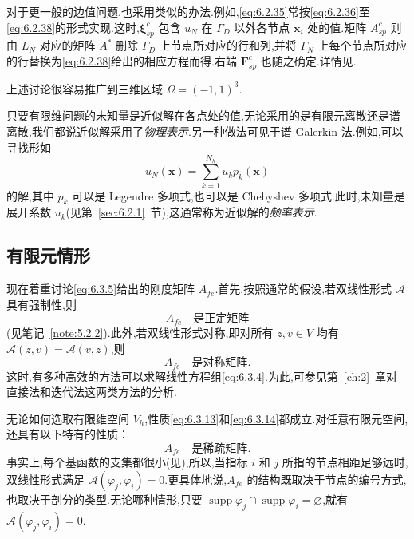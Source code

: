 对于更一般的边值问题,也采用类似的办法.例如,\eqref{eq:6.2.35}常按\eqref{eq:6.2.36}至\eqref{eq:6.2.38}的形式实现.这时,\(\boldsymbol{\xi}_{sp}^c\) 包含 \(u_N\) 在 \(\Gamma_D\) 以外各节点 \(\boldsymbol{x}_i\) 处的值.矩阵 \(A_{sp}^c\) 则由 \(L_N\) 对应的矩阵 \(A^*\) 删除 \(\Gamma_D\) 上节点所对应的行和列,并将 \(\Gamma_N\) 上每个节点所对应的行替换为\eqref{eq:6.2.38}给出的相应方程而得.右端 \(\boldsymbol{F}_{sp}^c\) 也随之确定.详情见.

上述讨论很容易推广到三维区域 \(\Omega=(-1,1)^3\).

只要有限维问题的未知量是近似解在各点处的值,无论采用的是有限元离散还是谱离散,我们都说近似解采用了\emph{物理表示}.另一种做法可见于谱 Galerkin 法.例如,可以寻找形如
\[
  u_N(\boldsymbol{x})=\sum_{k=1}^{N_h}u_k p_k(\boldsymbol{x})
\]
的解,其中 \(p_k\) 可以是 Legendre 多项式,也可以是 Chebyshev 多项式.此时,未知量是展开系数 \(u_k\)(见第~\ref{sec:6.2.1}~节),这通常称为近似解的\emph{频率表示}.

\subsection{有限元情形}\label{sec:6.3.2}

现在着重讨论\eqref{eq:6.3.5}给出的刚度矩阵 \(A_{fe}\).首先,按照通常的假设,若双线性形式 \(\mathcal A\) 具有强制性,则
\begin{equation}\label{eq:6.3.13}
  A_{fe}\quad\text{是正定矩阵}
\end{equation}
(见笔记~\ref{note:5.2.2}).此外,若双线性形式对称,即对所有 \(z,v\in V\) 均有 \(\mathcal A(z,v)=\mathcal A(v,z)\),则
\begin{equation}\label{eq:6.3.14}
  A_{fe}\quad\text{是对称矩阵}.
\end{equation}
这时,有多种高效的方法可以求解线性方程组\eqref{eq:6.3.4}.为此,可参见第~\ref{ch:2}~章对直接法和迭代法这两类方法的分析.

无论如何选取有限维空间 \(V_h\),性质\eqref{eq:6.3.13}和\eqref{eq:6.3.14}都成立.对任意有限元空间,还具有以下特有的性质：
\begin{equation}\label{eq:6.3.15}
  A_{fe}\quad\text{是稀疏矩阵}.
\end{equation}
事实上,每个基函数的支集都很小(见),所以,当指标 \(i\) 和 \(j\) 所指的节点相距足够远时,双线性形式满足 \(\mathcal A(\varphi_j,\varphi_i)=0\).更具体地说,\(A_{fe}\) 的结构既取决于节点的编号方式,也取决于剖分的类型.无论哪种情形,只要 \(\operatorname{supp}\varphi_j\cap\operatorname{supp}\varphi_i=\varnothing\),就有 \(\mathcal A(\varphi_j,\varphi_i)=0\).


